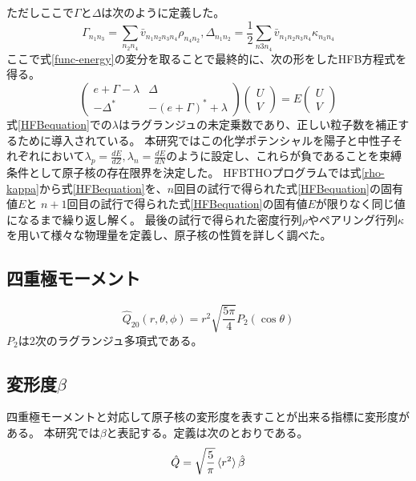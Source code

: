 \documentclass[12pt]{jarticle}
\begin{document}
ただしここで$\Gamma$と$\Delta$は次のように定義した。
\begin{equation}
    \label{Gamma-Delta}
    \Gamma_{n_1 n_3} = \sum_{n_2 n_4}\bar{v}_{n_1 n_2 n_3 n_4}\rho_{n_4 n_2}, \Delta_{n_1 n_2} = \frac{1}{2}\sum_{n3 n_4}\bar{v}_{n_1 n_2 n_3 n_4}\kappa_{n_3 n_4}
\end{equation}
ここで式\ref{func-energy}の変分を取ることで最終的に、次の形をしたHFB方程式を得る。
\begin{equation}
    \label{HFBequation}
    \begin{pmatrix}
        e + \Gamma - \lambda & \Delta \\
        - \Delta^* & - (e + \Gamma)^* + \lambda
    \end{pmatrix}
    \left(
        \begin{array}{c}
            U \\
            V
        \end{array}
    \right) =
    E
    \left(
        \begin{array}{c}
            U \\
            V
        \end{array}
    \right)
\end{equation}
式\ref{HFBequation}での$\lambda$はラグランジュの未定乗数であり、正しい粒子数を補正するために導入されている。
本研究ではこの化学ポテンシャルを陽子と中性子それぞれにおいて$\lambda_p=\frac{dE}{dZ}, \lambda_n=\frac{dE}{dN}$のように設定し、これらが負であることを束縛条件として原子核の存在限界を決定した。
HFBTHOプログラムでは式\ref{rho-kappa}から式\ref{HFBequation}を、$n$回目の試行で得られた式\ref{HFBequation}の固有値$E$と
$n+1$回目の試行で得られた式\ref{HFBequation}の固有値$E$が限りなく同じ値になるまで繰り返し解く。
最後の試行で得られた密度行列$\rho$やペアリング行列$\kappa$を用いて様々な物理量を定義し、原子核の性質を詳しく調べた。

\subsection{四重極モーメント}
\begin{equation}
    \label{quadrupole-moment-func}
    \hat{Q}_{20}(r,\theta,\phi) = r^2 \sqrt{\frac{5\pi}{4}} P_2(\cos{\theta})
\end{equation}
$P_2$は2次のラグランジュ多項式である。

\subsection{変形度$\beta$}
四重極モーメントと対応して原子核の変形度を表すことが出来る指標に変形度がある。
本研究では$\beta$と表記する。定義は次のとおりである。
\begin{equation}
    \label{beta-func}
    \hat{Q} = \sqrt{\frac{5}{\pi}}\ev*{r^2}\hat{\beta}
\end{equation}
\end{document}
